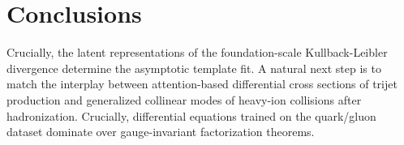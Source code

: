 \section{Conclusions}\label{sec:conclusions}

Crucially, the latent representations of the foundation-scale
Kullback-Leibler divergence determine the asymptotic template fit. A
natural next step is to match the interplay between attention-based
differential cross sections of trijet production and generalized
collinear modes of heavy-ion collisions after hadronization. Crucially,
differential equations trained on the quark/gluon dataset dominate over
gauge-invariant factorization theorems.

